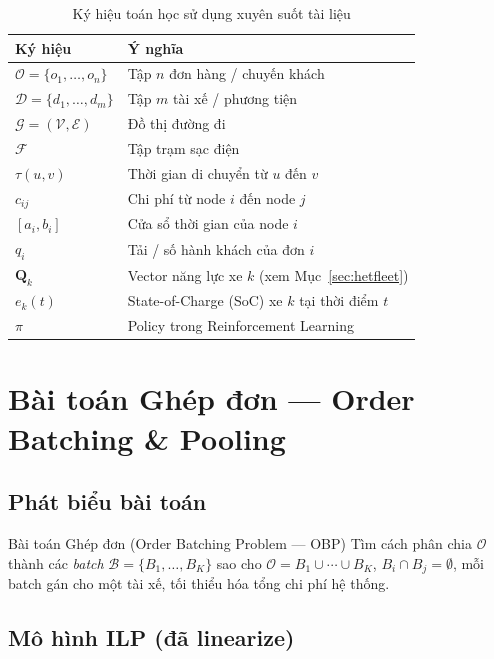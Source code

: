 \documentclass[12pt,a4paper]{article}
\begin{document}
\begin{table}[h!]
\centering
\caption{Ký hiệu toán học sử dụng xuyên suốt tài liệu}
\renewcommand{\arraystretch}{1.25}
\begin{tabular}{>{\ttfamily}ll}
\toprule
\textbf{Ký hiệu} & \textbf{Ý nghĩa} \\
\midrule
$\mathcal{O} = \{o_1,\ldots,o_n\}$ & Tập $n$ đơn hàng / chuyến khách \\
$\mathcal{D} = \{d_1,\ldots,d_m\}$ & Tập $m$ tài xế / phương tiện \\
$\mathcal{G} = (\mathcal{V},\mathcal{E})$ & Đồ thị đường đi \\
$\mathcal{F}$ & Tập trạm sạc điện \\
$\tau(u,v)$ & Thời gian di chuyển từ $u$ đến $v$ \\
$c_{ij}$ & Chi phí từ node $i$ đến node $j$ \\
$[a_i,b_i]$ & Cửa sổ thời gian của node $i$ \\
$q_i$ & Tải / số hành khách của đơn $i$ \\
$\mathbf{Q}_k$ & Vector năng lực xe $k$ (xem Mục~\ref{sec:hetfleet}) \\
$e_k(t)$ & State-of-Charge (SoC) xe $k$ tại thời điểm $t$ \\
$\pi$ & Policy trong Reinforcement Learning \\
\bottomrule
\end{tabular}
\end{table}

\section{Bài toán Ghép đơn --- Order Batching \& Pooling}

\subsection{Phát biểu bài toán}

\begin{definitionbox}{Bài toán Ghép đơn (Order Batching Problem --- OBP)}
Tìm cách phân chia $\mathcal{O}$ thành các \emph{batch}
$\mathcal{B} = \{B_1,\ldots,B_K\}$ sao cho
$\mathcal{O} = B_1 \cup \cdots \cup B_K$, $B_i \cap B_j = \emptyset$,
mỗi batch gán cho một tài xế, tối thiểu hóa tổng chi phí hệ thống.
\end{definitionbox}

\subsection{Mô hình ILP (đã linearize)}
\end{document}
